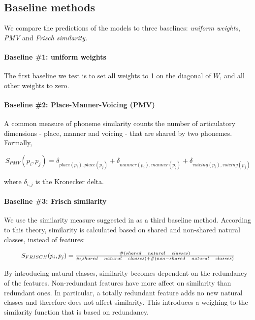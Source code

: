 \subsection{Baseline methods}
We compare the predictions of the models to three baselines: \textit{uniform weights}, \textit{PMV} and \textit{Frisch similarity}.

\paragraph{Baseline \#1: uniform weights} The first baseline we test is to set all weights to 1 on the diagonal of $W$, and all other weights to zero.

\paragraph{Baseline \#2: Place-Manner-Voicing (PMV)} A common measure of phoneme similarity counts the number of articulatory dimensions - place, manner and voicing - that are shared by two phonemes. Formally,

\begin{equation}
S_{PMV}(p_i, p_j) = \delta_{place(p_i),place(p_j)} + \delta_{manner(p_i),manner(p_j)} + \delta_{voicing(p_i),voicing(p_j)}
\end{equation}

where $\delta_{i,j}$ is the Kronecker delta.

\paragraph{Baseline \#3: Frisch similarity} We use the similarity measure suggested in \citet{Frisch1997} as a third baseline method. According to this theory, similarity is calculated based on shared and non-shared natural classes, instead of features:
 
\begin{equation}
\resizebox{.9\hsize}{!}{$S_{FRISCH}(p_i, p_j) = \frac{\#(shared \quad natural \quad classes)}{\#(shared \quad natural \quad classes) + \#(non-shared \quad natural \quad classes)}$}
\end{equation}

By introducing natural classes, similarity becomes dependent on the redundancy of the features. Non-redundant features have more affect on similarity than redundant ones. In particular, a totally redundant feature adds no new natural classes and therefore does not affect similarity. This introduces a weighing to the similarity function that is based on redundancy. \mbox{} \\

